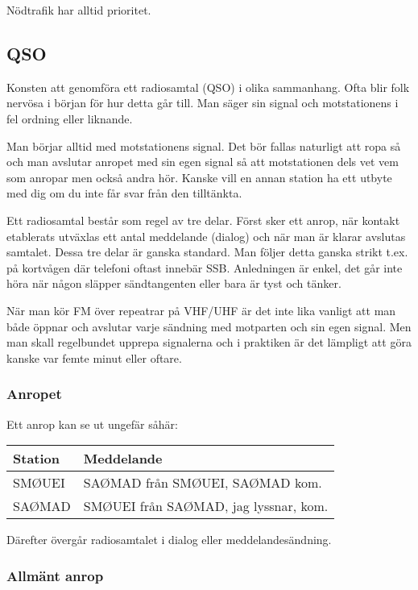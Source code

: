 Nödtrafik har alltid prioritet.

\subsection{QSO}

Konsten att genomföra ett radiosamtal (QSO) i olika sammanhang. Ofta blir folk
nervösa i början för hur detta går till. Man säger sin signal och motstationens
i fel ordning eller liknande.

Man börjar alltid med motstationens signal. Det bör fallas naturligt att ropa så
och man avslutar anropet med sin egen signal så att motstationen dels vet vem
som anropar men också andra hör. Kanske vill en annan station ha ett utbyte med
dig om du inte får svar från den tilltänkta.

Ett radiosamtal består som regel av tre delar. Först sker ett anrop, när kontakt
etablerats utväxlas ett antal meddelande (dialog) och när man är klarar avslutas
samtalet. Dessa tre delar är ganska standard. Man följer detta ganska strikt
t.ex. på kortvågen där telefoni oftast innebär SSB. Anledningen är enkel, det
går inte höra när någon släpper sändtangenten eller bara är tyst och tänker.

När man kör FM över repeatrar på VHF/UHF är det inte lika vanligt att man både
öppnar och avslutar varje sändning med motparten och sin egen signal. Men man
skall regelbundet upprepa signalerna och i praktiken är det lämpligt att göra
kanske var femte minut eller oftare.

\subsubsection{Anropet}

Ett anrop kan se ut ungefär såhär:

\begin{tabular}{ll}
	Station & Meddelande                            \\ \hline
	SMØUEI  & SAØMAD från SMØUEI, SAØMAD kom.       \\
	SAØMAD  & SMØUEI från SAØMAD, jag lyssnar, kom.
\end{tabular}

Därefter övergår radiosamtalet i dialog eller meddelandesändning.

\subsubsection{Allmänt anrop}

